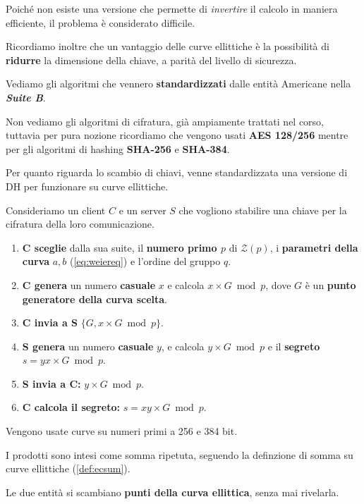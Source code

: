 Poiché non esiste una versione che permette di \textit{invertire} il calcolo in maniera efficiente, il problema è considerato difficile.\\
\begin{note}
Ricordiamo inoltre che un vantaggio delle curve ellittiche è la possibilità di \textbf{ridurre} la dimensione della chiave, a parità del livello di sicurezza.
\end{note}
Vediamo gli algoritmi che vennero \textbf{standardizzati} dalle entità Americane nella \textbf{\textit{Suite B}}.\\
\begin{remark}
Non vediamo gli algoritmi di cifratura, già ampiamente trattati nel corso, tuttavia per pura nozione ricordiamo che vengono usati \textbf{AES 128/256} mentre per gli algoritmi di hashing \textbf{SHA-256} e \textbf{SHA-384}.
\end{remark}
Per quanto riguarda lo scambio di chiavi, venne standardizzata una versione di DH per funzionare su curve ellittiche.
\begin{definition}\label{def:ecdh}
Consideriamo un client $C$ e un server $S$ che vogliono stabilire una chiave per la cifratura della loro comunicazione.
\begin{enumerate}
    \item \textbf{C sceglie} dalla sua suite, il \textbf{numero primo $p$} di $\mathcal{Z}(p)$, i \textbf{parametri della curva} $a,b$ (\cref{eq:weiereq}) e l'ordine del gruppo $q$.
    \item \textbf{C genera} un numero \textbf{casuale} $x$ e calcola $x\times G\bmod p$, dove $G$ è un \textbf{punto generatore della curva scelta}.
    \item \textbf{C invia a S} $\{G,x\times G\bmod p\}$.
    \item \textbf{S genera} un numero \textbf{casuale} $y$, e calcola $y\times G\bmod p$ e il \textbf{segreto} $s=yx\times G\bmod p$.
    \item \textbf{S invia a C:} $y\times G\bmod p$.
    \item \textbf{C calcola il segreto:} $s=xy\times G\bmod p$.
\end{enumerate}
Vengono usate curve su numeri primi a 256 e 384 bit.
\begin{remark}
I prodotti sono intesi come somma ripetuta, seguendo la definzione di somma su curve ellittiche (\cref{def:ecsum}).
\end{remark}
\begin{remark}
Le due entità si scambiano \textbf{punti della curva ellittica}, senza mai rivelarla.
\end{remark}
\end{definition}
